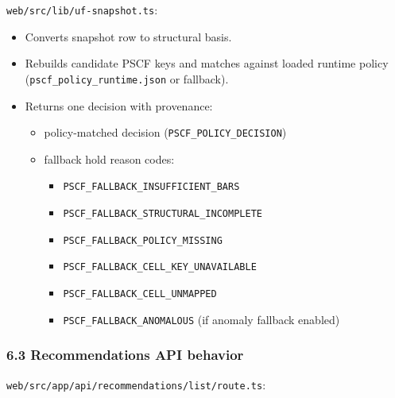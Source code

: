 \documentclass[
]{article}
\providecommand{\tightlist}{%
  \setlength{\itemsep}{0pt}\setlength{\parskip}{0pt}}
\begin{document}
\texttt{web/src/lib/uf-snapshot.ts}:

\begin{itemize}
\tightlist
\item
  Converts snapshot row to structural basis.
\item
  Rebuilds candidate PSCF keys and matches against loaded runtime policy
  (\texttt{pscf\_policy\_runtime.json} or fallback).
\item
  Returns one decision with provenance:

  \begin{itemize}
  \tightlist
  \item
    policy-matched decision (\texttt{PSCF\_POLICY\_DECISION})
  \item
    fallback hold reason codes:

    \begin{itemize}
    \tightlist
    \item
      \texttt{PSCF\_FALLBACK\_INSUFFICIENT\_BARS}
    \item
      \texttt{PSCF\_FALLBACK\_STRUCTURAL\_INCOMPLETE}
    \item
      \texttt{PSCF\_FALLBACK\_POLICY\_MISSING}
    \item
      \texttt{PSCF\_FALLBACK\_CELL\_KEY\_UNAVAILABLE}
    \item
      \texttt{PSCF\_FALLBACK\_CELL\_UNMAPPED}
    \item
      \texttt{PSCF\_FALLBACK\_ANOMALOUS} (if anomaly fallback enabled)
    \end{itemize}
  \end{itemize}
\end{itemize}

\subsubsection{6.3 Recommendations API
behavior}\label{63-recommendations-api-behavior}

\texttt{web/src/app/api/recommendations/list/route.ts}:
\end{document}
